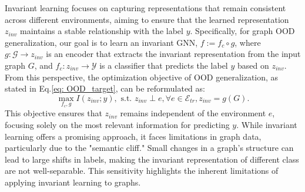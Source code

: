 Invariant learning focuses on capturing representations that remain consistent across different environments, aiming to ensure that the learned representation $z_{inv}$ maintains a stable relationship with the label $y$. Specifically, for graph OOD generalization, our goal is to learn an invariant GNN, $f:= f_{c} \circ g$, where $g: \mathcal{G} \rightarrow z_{inv}$ is an encoder that extracts the invariant representation from the input graph $G$, and $f_{c}: z_{inv} \rightarrow \mathcal{Y}$ is a classifier that predicts the label $y$ based on $z_{inv}$. From this perspective, the optimization objective of OOD generalization, as stated in Eq.\ref{eq: OOD_target}, can be reformulated as: 
\begin{equation}
\label{eq: causal} \max_{f_{c}, g} I(z_{inv}; y), \text{ s.t. } z_{inv} \perp e,\forall e \in \mathcal{E}_{tr}, z_{inv} = g(G). 
\end{equation}
This objective ensures that $z_{inv}$ remains independent of the environment $e$, focusing solely on the most relevant information for predicting $y$. While invariant learning offers a promising approach, it faces limitations in graph data, particularly due to the "semantic cliff." Small changes in a graph’s structure can lead to large shifts in labels, making the invariant representation of different class are not well-separable. This sensitivity highlights the inherent limitations of applying invariant learning to graphs.


